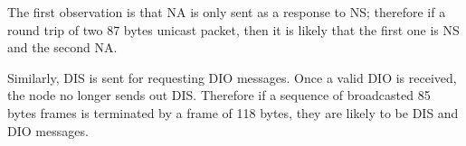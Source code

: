 The first observation is that NA is only sent as a response to NS; therefore if a round trip of two 87 bytes unicast packet, then it is likely that the first one is NS and the second NA.

Similarly, DIS is sent for requesting DIO messages.  Once a valid DIO is received, the node no longer sends out DIS. Therefore if a sequence of broadcasted 85 bytes frames is terminated by a frame of 118 bytes, they are likely to be DIS and DIO messages.







